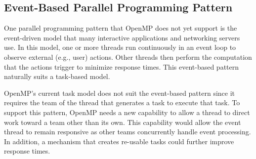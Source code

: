 \subsection{Event-Based Parallel Programming Pattern}
\label{sub:concurrency_and_event_based_model}

One parallel programming pattern that OpenMP does not yet support is the
event-driven model that many interactive applications and networking servers
use. In this model, one or more threads run continuously in an event loop to 
observe external (e.g., user) actions. Other threads then perform the 
computation that the actions trigger to minimize response times. This 
event-based pattern naturally suits a task-based model. 
 
OpenMP's current task model does not suit the event-based pattern since it 
requires the team of the thread that generates a task to execute that task. 
To support this pattern, OpenMP needs a new capability to allow a thread to 
direct work toward a team other than its own. This capability would allow 
the event thread to remain responsive as other teams concurrently handle 
event processing. In addition, a mechanism that creates re-usable tasks 
could further improve response times. 

